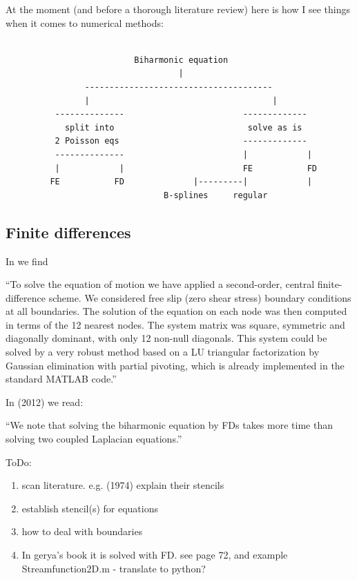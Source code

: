 At the moment (and before a thorough literature review) here is 
how I see things when it comes to numerical methods:

\begin{verbatim}

                          Biharmonic equation
                                   |
                --------------------------------------
                |                                     |
          --------------                        -------------
            split into                           solve as is
          2 Poisson eqs                         -------------
          --------------                        |            |
          |            |                        FE           FD
         FE           FD              |---------|            |
                                B-splines     regular
\end{verbatim}



\subsection{Finite differences}

In \textcite{vanv08} we find 
\begin{displayquote}
{\color{darkgray}
``To solve the equation of motion we have applied a second-order, central finite-
difference scheme. We considered free slip (zero shear stress) boundary conditions at all
boundaries. The solution of the equation on each node was then computed in
terms of the 12 nearest nodes. The system matrix was square, symmetric and diagonally
dominant, with only 12 non-null diagonals. This system could be solved by a very robust
method based on a LU triangular factorization by Gaussian elimination with partial
pivoting, which is already implemented in the standard MATLAB code.''
}
\end{displayquote}


\noindent In \textcite{zhym12} (2012) we read:
\begin{displayquote}
{\color{darkgray}
``We note that solving the biharmonic equation by FDs takes more time than 
solving two coupled Laplacian equations.''
}
\end{displayquote}


\vspace{1cm}

{\color{orange}
ToDo:
\begin{enumerate}
\item scan literature. e.g. \textcite{mcrw74} (1974) explain their stencils
\item establish stencil(s) for equations
\item how to deal with boundaries
\item In gerya's book it is solved with FD. see page 72, and example Streamfunction2D.m - translate to python?
\end{enumerate}
}

